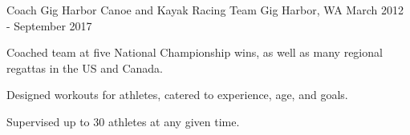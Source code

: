 \begin{cventries}
  \cventry
    {Coach} %
    {Gig Harbor Canoe and Kayak Racing Team} %
    {Gig Harbor, WA} %
    {March 2012 - September 2017} %
    {
      \begin{cvitems} %
        \item {Coached team at five National Championship wins, as well as many regional regattas in the US and Canada.}
		\item {Designed workouts for athletes, catered to experience, age, and goals.}
		\item{Supervised up to 30 athletes at any given time.}
      \end{cvitems}
    }

  
\end{cventries}
